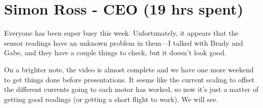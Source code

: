 \documentclass[12pt, titlepage]{article}
\begin{document}
\section*{Simon Ross - CEO (19 hrs spent)}

Everyone has been super busy this week. Unfortunately, it appears that the sensor readings have an unknown problem in them---I talked with Brady and Gabe, and they have a couple things to check, but it doesn't look good. 

On a brighter note, the video is almost complete and we have one more weekend to get things done before presentations. It seems like the current scaling to offset the different currents going to each motor has worked, so now it's just a matter of getting good readings (or getting a short flight to work). We will see.
\end{document}
